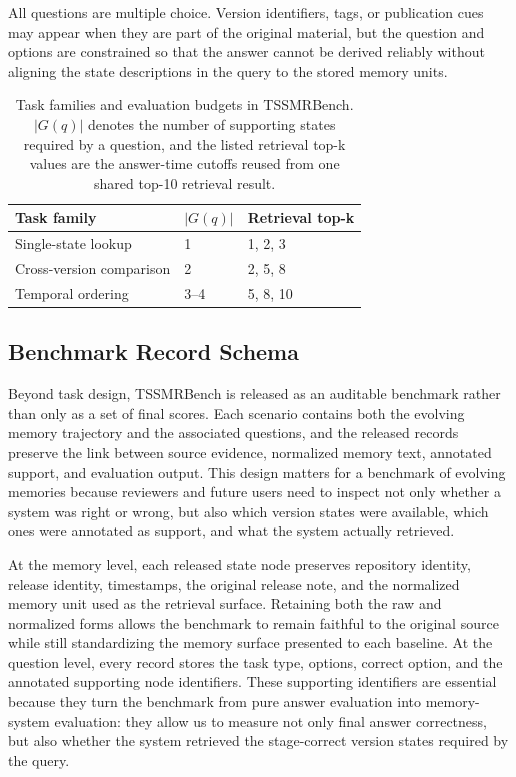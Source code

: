 All questions are multiple choice. Version identifiers, tags, or publication cues may appear when they are part of the original material, but the question and options are constrained so that the answer cannot be derived reliably without aligning the state descriptions in the query to the stored memory units.

\begin{table}[!b]
\centering
\small
\caption{Task families and evaluation budgets in TSSMRBench. $|G(q)|$ denotes the number of supporting states required by a question, and the listed retrieval top-k values are the answer-time cutoffs reused from one shared top-10 retrieval result.}
\label{tab:task-family-budget}
\begin{tabular}{lll}
\toprule
Task family & $|G(q)|$ & Retrieval top-k \\
\midrule
Single-state lookup & 1 & 1, 2, 3 \\
Cross-version comparison & 2 & 2, 5, 8 \\
Temporal ordering & 3--4 & 5, 8, 10 \\
\bottomrule
\end{tabular}
\end{table}

\subsection{Benchmark Record Schema}

Beyond task design, TSSMRBench is released as an auditable benchmark rather than only as a set of final scores. Each scenario contains both the evolving memory trajectory and the associated questions, and the released records preserve the link between source evidence, normalized memory text, annotated support, and evaluation output. This design matters for a benchmark of evolving memories because reviewers and future users need to inspect not only whether a system was right or wrong, but also which version states were available, which ones were annotated as support, and what the system actually retrieved.

At the memory level, each released state node preserves repository identity, release identity, timestamps, the original release note, and the normalized memory unit used as the retrieval surface. Retaining both the raw and normalized forms allows the benchmark to remain faithful to the original source while still standardizing the memory surface presented to each baseline. At the question level, every record stores the task type, options, correct option, and the annotated supporting node identifiers. These supporting identifiers are essential because they turn the benchmark from pure answer evaluation into memory-system evaluation: they allow us to measure not only final answer correctness, but also whether the system retrieved the stage-correct version states required by the query.

